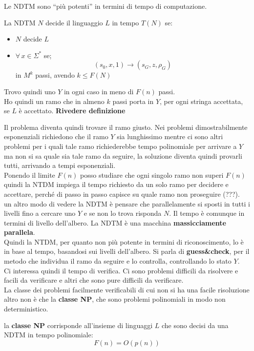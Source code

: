 \documentclass[a4paper,12pt, oneside]{book}
\begin{document}
Le NDTM sono ``più potenti'' in termini di tempo di computazione.
\begin{definizione}
  La NDTM $N$ decide il linguaggio $L$ in tempo $T(N)$ se:
  \begin{itemize}
    \item $N$ decide $L$
    \item $\forall\,x\in \Sigma^*$ se;
    \[(s_0,x,1)\to(s_G, z, \rho_G)\]
    in $M^k$ passi, avendo $k\leq F(N)$
  \end{itemize}
  Trovo quindi uno $Y$ in ogni caso in meno di $F(n)$ passi.\\
  Ho quindi un ramo che in almeno $k$ passi porta in $Y$, per ogni stringa
  accettata, se $L$ è accettato. 
  \textbf{Rivedere definizione}
\end{definizione}
Il problema diventa quindi trovare il ramo giusto. Nei problemi dimostrabilmente
esponenziali richiedono che il ramo $Y$ sia lunghissimo mentre ci sono altri
problemi per i quali tale ramo richiederebbe tempo polinomiale per arrivare a
$Y$ ma non si sa quale sia tale ramo da seguire, la soluzione diventa quindi
provarli tutti, arrivando a tempi esponenziali.\\
Ponendo il limite $F(n)$ posso studiare che ogni singolo ramo non superi $F(n)$
quindi la NTDM impiega il tempo richiesto da un solo ramo per decidere e
accettare, perché di passo in passo capisce su quale ramo non proseguire
(???).\\
un altro modo di vedere la NDTM è pensare che parallelamente si sposti in tutti
i livelli fino a cercare uno $Y$ e se non lo trova risponda $N$. Il tempo è
comunque in termini di livello dell'albero. La NDTM è una macchina
\textbf{massicciamente parallela}.\\
Quindi la NTDM, per quanto non più potente in termini di riconoscimento, lo è in
base al tempo, basandosi sui livelli dell'albero. 
Si parla di \textbf{guess\&check}, per il metodo che individua il ramo da
seguire e lo controlla, controllando lo stato $Y$.\\
Ci interessa quindi il tempo di verifica. Ci sono problemi difficili da
risolvere e facili da verificare e altri che sono pure difficili da
verificare.\\
La classe dei problemi facilmente verificabili di cui non si ha una facile
risoluzione altro non è che la \textbf{classe NP}, che sono problemi polinomiali
in modo non deterministico.
\begin{definizione}
  la \textbf{classe NP} corrisponde all'insieme di linguaggi $L$ che sono decisi
  da una NDTM in tempo polinomiale:
  \[F(n)=O(p(n))\]
\end{definizione}
\end{document}

